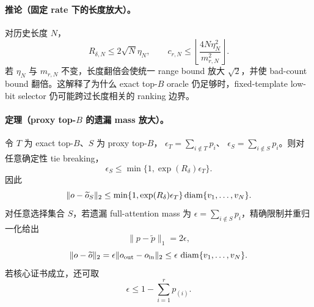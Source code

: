 \paragraph{推论（固定 rate 下的长度放大）。}
对历史长度 $N$，
\begin{equation}
 R_{\delta,N}\le2\sqrt N\eta_N,\qquad
 c_{r,N}\le
 \left\lfloor\frac{4N\eta_N^2}{m_{r,N}^2}\right\rfloor.
 \label{eq:length-amplification}
\end{equation}
若 $\eta_N$ 与 $m_{r,N}$ 不变，长度翻倍会使统一 range bound 放大
$\sqrt2$，并使 bad-count bound 翻倍。这解释了为什么 exact top-$B$ oracle
仍足够时，fixed-template low-bit selector 仍可能跨过长度相关的 ranking
边界。

\paragraph{定理（proxy top-$B$ 的遗漏 mass 放大）。}
令 $T$ 为 exact top-$B$、$S$ 为 proxy top-$B$，
$\epsilon_T=\sum_{i\notin T}p_i$、
$\epsilon_S=\sum_{i\notin S}p_i$。则对任意确定性 tie breaking，
\begin{equation}
 \epsilon_S\le
 \min\{1,\exp(R_\delta)\epsilon_T\}.
 \label{eq:proxy-topb-mass-inflation}
\end{equation}
因此
\begin{equation}
 \|o-\widetilde o_S\|_2
 \le\min\{1,\exp(R_\delta)\epsilon_T\}
 \operatorname{diam}\{v_1,\ldots,v_N\}.
 \label{eq:proxy-topb-output-bound}
\end{equation}
对任意选择集合 $S$，若遗漏 full-attention mass 为
$\epsilon=\sum_{i\notin S}p_i$，精确限制并重归一化给出
\begin{equation}
 \|p-\widetilde p\|_1=2\epsilon,
 \label{eq:l1-mass}
\end{equation}
\begin{equation}
 \|o-\widetilde o\|_2
 =\epsilon\|o_{\rm out}-o_{\rm in}\|_2
 \le\epsilon\,\operatorname{diam}\{v_1,\ldots,v_N\}.
 \label{eq:output-mass}
\end{equation}
若核心证书成立，还可取
\begin{equation}
 \epsilon\le1-\sum_{i=1}^{r}p_{(i)}.
 \label{eq:certified-mass}
\end{equation}

